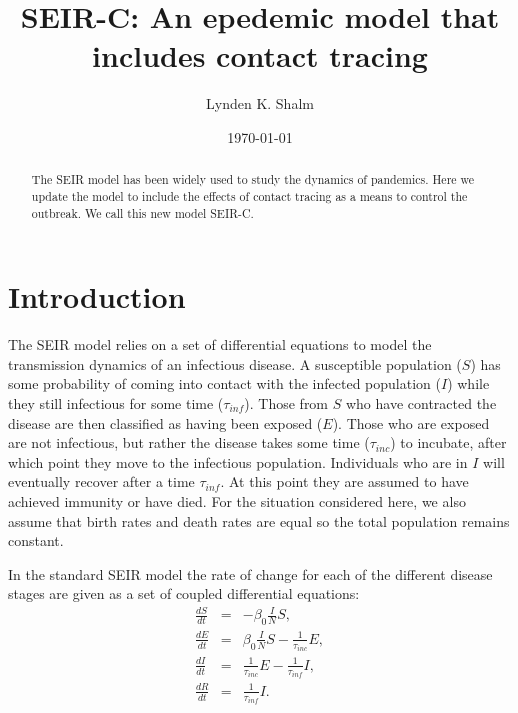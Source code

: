 \documentclass[notitlepage, superscriptaddress]{revtex4-2}
\begin{document}
\title{SEIR-C: An epedemic model that includes contact tracing}

\author{Lynden K. Shalm}



\begin{abstract}
The SEIR model has been widely used to study the dynamics of pandemics. Here we update the model to include the effects of contact tracing as a means to control the outbreak. We call this new model SEIR-C.
\end{abstract}
\date{\today}
\maketitle

\section{Introduction}
The SEIR model relies on a set of differential equations to model the transmission dynamics of an infectious disease. A susceptible population ($S$) has some probability of coming into contact with the infected population ($I$) while they still infectious for some time ($\tau_{inf}$). Those from $S$ who have contracted the disease are then classified as having been exposed ($E$). Those who are exposed are not infectious, but rather the disease takes some time ($\tau_{inc}$) to incubate, after which point they move to the infectious population. Individuals who are in $I$ will eventually recover after a time $\tau_{inf}$. At this point they are assumed to have achieved immunity or have died. For the situation considered here, we also assume that birth rates and death rates are equal so the total population remains constant. 

In the standard SEIR model the rate of change for each of the different disease stages are given as a set of coupled differential equations:
\begin{eqnarray}
\label{E:SEIR}
\frac{dS}{dt} &=& - \beta_0 \frac{I}{N}S, \\
\frac{dE}{dt} &=& \beta_0 \frac{I}{N}S - \frac{1}{\tau_{inc}}E, \\ 
\frac{dI}{dt} &=& \frac{1}{\tau_{inc}}E - \frac{1}{\tau_{inf}}I, \\ 
\frac{dR}{dt} &=& \frac{1}{\tau_{inf}}I.
\end{eqnarray}
\end{document}
